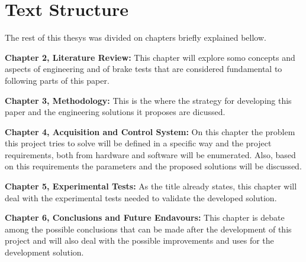 	\section{Text Structure}\label{sec:text-structure}
	
	The rest of this thesys was divided on chapters briefly explained bellow.
	
	\textbf{Chapter 2, Literature Review: } This chapter will explore somo concepts and aspects of engineering and of brake tests that are considered fundamental to following parts of this paper.
	\par
	
	\textbf{Chapter 3, Methodology: }
	This is the where the strategy for developing this paper and the engineering solutions it proposes are dicussed.
	\par
	
	\textbf{Chapter 4, Acquisition and Control System: }
	On this chapter the problem this project tries to solve will be defined in a specific way and the project requirements, both from hardware and software will be enumerated. Also, based on this requirements the parameters and the proposed solutions will be discussed.
	\par
	
	\textbf{Chapter 5, Experimental Tests: }
	As the title already states, this chapter will deal with the experimental tests needed to validate the developed solution.
	\par
	
	\textbf{Chapter 6, Conclusions and Future Endavours: }
	This chapter is debate among the possible conclusions that can be made after the development of this project and will also deal with the possible improvements and uses for the development solution.